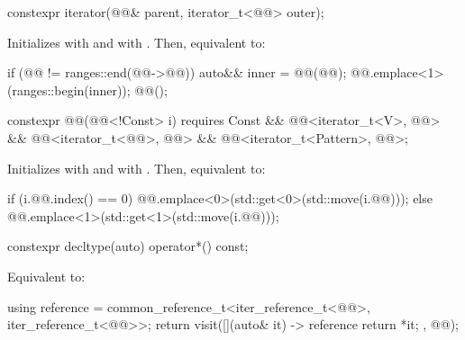 \begin{itemdecl}
constexpr iterator(@@& parent, iterator_t<@@> outer);
\end{itemdecl}

\begin{itemdescr}
\pnum
\effects
Initializes  with  and
 with .
Then, equivalent to:
\begin{codeblock}
if (@@ != ranges::end(@@->@@)) {
  auto&& inner = @@(@@);
  @@.emplace<1>(ranges::begin(inner));
  @@();
}
\end{codeblock}
\end{itemdescr}

\begin{itemdecl}
constexpr @@(@@<!Const> i)
    requires Const && @@<iterator_t<V>, @@> &&
             @@<iterator_t<@@>, @@> &&
             @@<iterator_t<Pattern>, @@>;
\end{itemdecl}

\begin{itemdescr}
\pnum
\effects
Initializes  with
 and
 with .
Then, equivalent to:
\begin{codeblock}
if (i.@@.index() == 0)
  @@.emplace<0>(std::get<0>(std::move(i.@@)));
else
  @@.emplace<1>(std::get<1>(std::move(i.@@)));
\end{codeblock}
\end{itemdescr}

\begin{itemdecl}
constexpr decltype(auto) operator*() const;
\end{itemdecl}

\begin{itemdescr}
\pnum
\effects
Equivalent to:
\begin{codeblock}
using reference =
  common_reference_t<iter_reference_t<@@>, iter_reference_t<@@>>;
return visit([](auto& it) -> reference { return *it; }, @@);
\end{codeblock}
\end{itemdescr}

